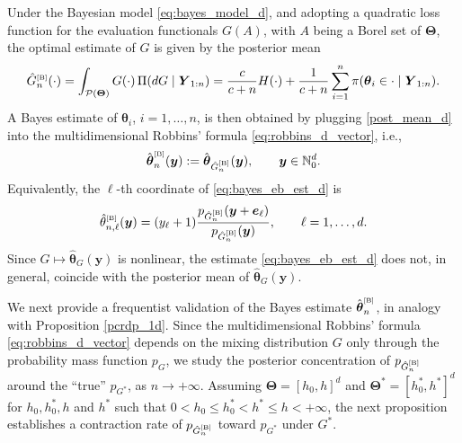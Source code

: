 \documentclass[twoside,12pt]{article}
\begin{document}
Under the Bayesian model \eqref{eq:bayes_model_d}, and adopting a quadratic loss function for the evaluation functionals \(G(A)\), with \(A\) being a Borel set of \(\boldsymbol\Theta\), the optimal estimate of \(G\) is given by the posterior mean
\begin{equation}\label{post_mean_d}
\hat G_n^{\text{\tiny{[B]}}}(\cdot)=\int_{\mathcal P(\boldsymbol\Theta)}G(\cdot)\,\Pi(dG\mid \boldsymbol Y_{1:n})=\frac{c}{c+n}H(\cdot)+\frac{1}{c+n}\sum_{i=1}^n
\pi(\boldsymbol\theta_i\in \cdot\mid \boldsymbol Y_{1:n}).
\end{equation}
A Bayes estimate of \(\boldsymbol\theta_i\), \(i=1,\ldots,n\), is then obtained by plugging \eqref{post_mean_d} into the multidimensional Robbins' formula \eqref{eq:robbins_d_vector}, i.e.,
\begin{equation}\label{eq:bayes_eb_est_d}
\hat{\boldsymbol\theta}^{\text{\tiny{[B]}}}_{n}(\boldsymbol y):=\hat{\boldsymbol\theta}_{\hat G_n^{\text{\tiny{[B]}}}}(\boldsymbol y),\qquad\boldsymbol y\in\mathbb N_0^d.
\end{equation}
Equivalently, the $\ell$-th coordinate of \eqref{eq:bayes_eb_est_d} is
\begin{displaymath}
\hat\theta^{\text{\tiny{[B]}}}_{n,\ell}(\boldsymbol y)=(y_\ell+1)\frac{p_{\hat G_n^{\text{\tiny{[B]}}}}(\boldsymbol y+\boldsymbol e_\ell)}{p_{\hat G_n^{\text{\tiny{[B]}}}}(\boldsymbol y)},\qquad \ell=1,\ldots,d.
\end{displaymath}
Since \(G\mapsto \hat{\boldsymbol\theta}_G(\boldsymbol y)\) is nonlinear, the estimate \eqref{eq:bayes_eb_est_d} does not, in general, coincide with the posterior mean of \(\hat{\boldsymbol\theta}_G(\boldsymbol y)\).

We next provide a frequentist validation of the Bayes estimate $\hat{\boldsymbol\theta}^{\text{\tiny{[B]}}}_{n}$, in analogy with Proposition \ref{pcrdp_1d}. Since the multidimensional Robbins' formula \eqref{eq:robbins_d_vector} depends on the mixing distribution $G$ only through the probability mass function $p_G$, we study the posterior concentration of $p_{\hat G_n^{\text{\tiny{[B]}}}}$ around the ``true'' $p_{G^\ast}$, as $n\rightarrow+\infty$. Assuming $\boldsymbol{\Theta}=[h_0,h]^d$ and $\boldsymbol{\Theta}^\ast=[h_0^\ast,h^\ast]^d$ for $h_0,h_0^\ast,h$ and $h^\ast$ such that $0<h_0\leq h_0^\ast<h^\ast\leq h<+\infty$, the next proposition establishes a contraction rate of $p_{\hat G_n^{\text{\tiny{[B]}}}}$ toward $p_{G^\ast}$ under $G^{\ast}$.
\end{document}
